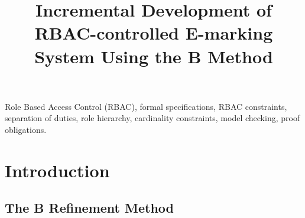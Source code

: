 \documentclass[conference]{IEEEtran}
\begin{document}
\title{Incremental Development of RBAC-controlled E-marking System Using the B Method}

{\author{
\and
{}
\and
{}
}

\maketitle

\begin{abstract}



\end{abstract}

\begin{IEEEkeywords}
Role Based Access Control (RBAC), formal specifications, RBAC constraints, separation of duties, role hierarchy, cardinality constraints, model checking, proof obligations.
\end{IEEEkeywords}
\acresetall


 
\maketitle




\section{Introduction} 



\subsection{The B Refinement Method}

}
\end{document}
